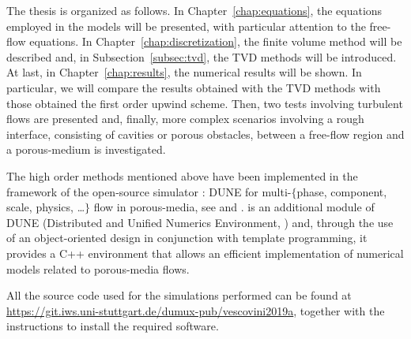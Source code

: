 The thesis is organized as follows. In Chapter~\ref{chap:equations}, the equations employed in the models will be 
presented, with particular attention to the free-flow equations. In 
Chapter~\ref{chap:discretization}, the finite volume method will be described 
and, in Subsection~\ref{subsec:tvd}, the TVD methods will be introduced. At last, 
in Chapter~\ref{chap:results}, the numerical results will be shown. In 
particular, we will
compare the results obtained with the TVD methods with those obtained
the first order upwind scheme. Then, two tests 
involving turbulent flows are presented and, finally, more complex scenarios involving 
a rough interface, consisting of cavities or porous obstacles, between a free-flow region and a porous-medium is investigated.

The high order methods mentioned above have been implemented in the framework 
of the open-source simulator \DUMUX: DUNE for multi-$\{$phase, component, 
scale, physics, \dots$\}$ flow in porous-media, see \cite{dumux:tutti} and 
\cite{dumux:flemisch}. \DUMUX is an 
additional module of DUNE (Distributed and Unified Numerics Environment, 
\cite{web:dune}) and, through the use of an object-oriented design in 
conjunction with template programming, it provides a C++ environment that 
allows an efficient implementation of numerical models related to porous-media 
flows.

All the source code used for the simulations performed can be 
found at \url{https://git.iws.uni-stuttgart.de/dumux-pub/vescovini2019a}, 
together with the instructions to install the required software.